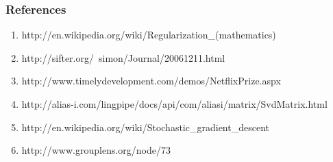 \documentclass[12pt]{article}
\begin{document}
\subsubsection*{References}
\begin{enumerate}
  \item http://en.wikipedia.org/wiki/Regularization\_(mathematics)
  \item http://sifter.org/~simon/Journal/20061211.html
  \item http://www.timelydevelopment.com/demos/NetflixPrize.aspx
  \item http://alias-i.com/lingpipe/docs/api/com/aliasi/matrix/SvdMatrix.html
  \item http://en.wikipedia.org/wiki/Stochastic\_gradient\_descent
  \item http://www.grouplens.org/node/73
\end{enumerate}
\end{document}
